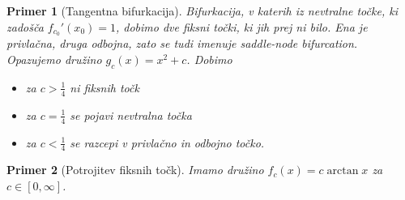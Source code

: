 \documentclass{article}
\newtheorem{primer}{Primer}
\begin{document}
\begin{primer}[Tangentna bifurkacija]
Bifurkacija, v katerih iz nevtralne točke, ki zadošča $f_{c_0}'(x_0) = 1$, 
dobimo dve fiksni točki, ki jih prej ni bilo. Ena je privlačna, druga odbojna, 
zato se tudi imenuje saddle-node bifurcation. 
Opazujemo družino $g_c(x) = x^2 + c$. Dobimo 
\begin{itemize}
    \item za $c > \frac{1}{4}$ ni fiksnih točk 
    \item za $c = \frac{1}{4}$ se pojavi nevtralna točka 
    \item za $c < \frac{1}{4}$ se razcepi v privlačno in odbojno točko.
\end{itemize}
\end{primer}

\begin{primer}[Potrojitev fiksnih točk]
Imamo družino $f_c(x) = c\arctan{x}$ za $c\in [0, \infty]$.


\end{primer}
\end{document}
